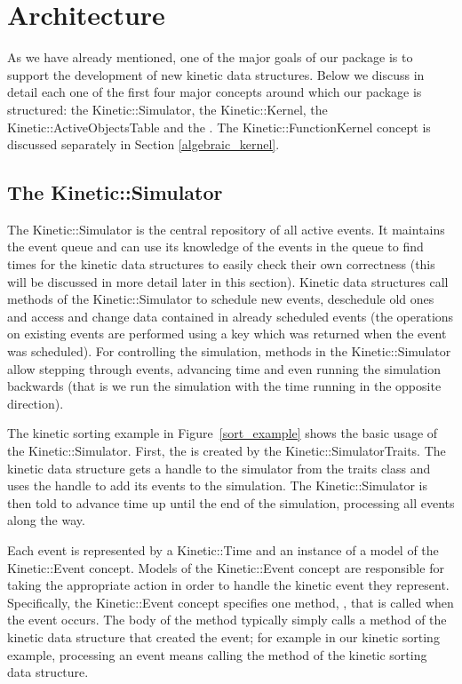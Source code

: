 
\section{Architecture}
\label{sec:architecture}

As we have already mentioned, one of the major goals of our package is
to support the development of new kinetic data structures. Below we
discuss in detail each one of the first four major concepts around which our
package is structured: the Kinetic::Simulator, the
Kinetic::Kernel, the Kinetic::ActiveObjectsTable and the
.  The Kinetic::FunctionKernel concept is
discussed separately in Section \ref{algebraic_kernel}.

\subsection{The Kinetic::Simulator}
\label{simulator}

The Kinetic::Simulator is the central repository of all active events.
It maintains the event queue and can use its knowledge of the events
in the queue to find times for the kinetic data structures to easily
check their own correctness (this will be discussed in more detail
later in this section). Kinetic data structures call methods of the
Kinetic::Simulator to schedule new events, deschedule old ones and
access and change data contained in already scheduled events (the
operations on existing events are performed using a key which was
returned when the event was scheduled).  For controlling the
simulation, methods in the Kinetic::Simulator allow stepping through
events, advancing time and even running the simulation backwards (that
is we run the simulation with the time running in the opposite
direction).

The kinetic sorting example in Figure~\ref{sort_example} shows the
basic usage of the Kinetic::Simulator. First, the 
is created by the Kinetic::SimulatorTraits. The kinetic data structure
gets a handle to the simulator from the traits class and uses the
handle to add its events to the simulation. The Kinetic::Simulator is
then told to advance time up until the end of the simulation,
processing all events along the way.

Each event is represented by a Kinetic::Time and an instance of a
model of the Kinetic::Event concept.  Models of the Kinetic::Event
concept are responsible for taking the appropriate action in order to
handle the kinetic event they represent.  Specifically, the
Kinetic::Event concept specifies one method,
, that is called when the event occurs.
The body of the  method typically
simply calls a method of the kinetic data structure that created the
event; for example in our kinetic sorting example, processing an event
means calling the 
method of the kinetic sorting data structure.

